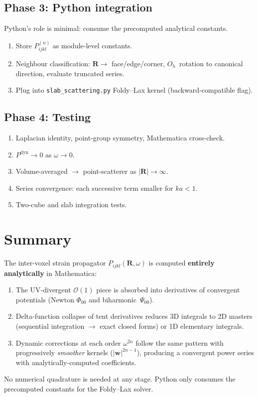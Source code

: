 \documentclass[11pt,a4paper]{article}
\newcommand{\bR}{\bm{R}}
\newcommand{\bw}{\bm{w}}
\newcommand{\order}{\mathcal{O}}
\theoremstyle{plain}
\theoremstyle{remark}
\begin{document}
\subsection{Phase 3: Python integration}

Python's role is minimal: consume the precomputed analytical constants.
\begin{enumerate}[label=\textbf{3\alph*.},nosep]
  \item Store $P^{(n)}_{ijkl}$ as module-level constants.
  \item Neighbour classification: $\bR\to$ face/edge/corner,
    $O_h$~rotation to canonical direction, evaluate truncated series.
  \item Plug into \texttt{slab\_scattering.py} Foldy--Lax kernel
    (backward-compatible flag).
\end{enumerate}

\subsection{Phase 4: Testing}

\begin{enumerate}[label=\textbf{4\alph*.},nosep]
  \item Laplacian identity, point-group symmetry, Mathematica cross-check.
  \item $P^{\mathrm{dyn}}\to 0$ as $\omega\to 0$.
  \item Volume-averaged $\to$ point-scatterer as $|\bR|\to\infty$.
  \item Series convergence: each successive term smaller for $ka < 1$.
  \item Two-cube and slab integration tests.
\end{enumerate}


\section{Summary}
\label{sec:summary}

The inter-voxel strain propagator $P_{ijkl}(\bR,\omega)$ is computed
\textbf{entirely analytically} in Mathematica:
\begin{enumerate}[nosep]
  \item The UV-divergent $\order(1)$ piece is absorbed into
    derivatives of convergent potentials (Newton $\Phi_{00}$ and
    biharmonic~$\Psi_{00}$).
  \item Delta-function collapse of tent derivatives reduces 3D
    integrals to 2D masters (sequential integration $\to$ exact
    closed forms) or 1D elementary integrals.
  \item Dynamic corrections at each order $\omega^{2n}$ follow the
    same pattern with progressively \emph{smoother} kernels
    ($|\bw|^{2n-1}$), producing a convergent power series with
    analytically-computed coefficients.
\end{enumerate}
No numerical quadrature is needed at any stage.  Python only consumes
the precomputed constants for the Foldy--Lax solver.
\end{document}
